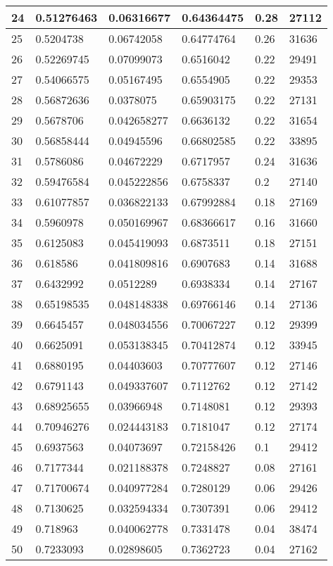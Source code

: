 \begin{longtable}{|l|l|l|l|l|l|}
24 & 0.51276463 & 0.06316677 & 0.64364475 & 0.28 & 27112 \\ \hline 
25 & 0.5204738 & 0.06742058 & 0.64774764 & 0.26 & 31636 \\ \hline 
26 & 0.52269745 & 0.07099073 & 0.6516042 & 0.22 & 29491 \\ \hline 
27 & 0.54066575 & 0.05167495 & 0.6554905 & 0.22 & 29353 \\ \hline 
28 & 0.56872636 & 0.0378075 & 0.65903175 & 0.22 & 27131 \\ \hline 
29 & 0.5678706 & 0.042658277 & 0.6636132 & 0.22 & 31654 \\ \hline 
30 & 0.56858444 & 0.04945596 & 0.66802585 & 0.22 & 33895 \\ \hline 
31 & 0.5786086 & 0.04672229 & 0.6717957 & 0.24 & 31636 \\ \hline 
32 & 0.59476584 & 0.045222856 & 0.6758337 & 0.2 & 27140 \\ \hline 
33 & 0.61077857 & 0.036822133 & 0.67992884 & 0.18 & 27169 \\ \hline 
34 & 0.5960978 & 0.050169967 & 0.68366617 & 0.16 & 31660 \\ \hline 
35 & 0.6125083 & 0.045419093 & 0.6873511 & 0.18 & 27151 \\ \hline 
36 & 0.618586 & 0.041809816 & 0.6907683 & 0.14 & 31688 \\ \hline 
37 & 0.6432992 & 0.0512289 & 0.6938334 & 0.14 & 27167 \\ \hline 
38 & 0.65198535 & 0.048148338 & 0.69766146 & 0.14 & 27136 \\ \hline 
39 & 0.6645457 & 0.048034556 & 0.70067227 & 0.12 & 29399 \\ \hline 
40 & 0.6625091 & 0.053138345 & 0.70412874 & 0.12 & 33945 \\ \hline 
41 & 0.6880195 & 0.04403603 & 0.70777607 & 0.12 & 27146 \\ \hline 
42 & 0.6791143 & 0.049337607 & 0.7112762 & 0.12 & 27142 \\ \hline 
43 & 0.68925655 & 0.03966948 & 0.7148081 & 0.12 & 29393 \\ \hline 
44 & 0.70946276 & 0.024443183 & 0.7181047 & 0.12 & 27174 \\ \hline 
45 & 0.6937563 & 0.04073697 & 0.72158426 & 0.1 & 29412 \\ \hline 
46 & 0.7177344 & 0.021188378 & 0.7248827 & 0.08 & 27161 \\ \hline 
47 & 0.71700674 & 0.040977284 & 0.7280129 & 0.06 & 29426 \\ \hline 
48 & 0.7130625 & 0.032594334 & 0.7307391 & 0.06 & 29412 \\ \hline 
49 & 0.718963 & 0.040062778 & 0.7331478 & 0.04 & 38474 \\ \hline 
50 & 0.7233093 & 0.02898605 & 0.7362723 & 0.04 & 27162 \\ \hline 
\end{longtable}